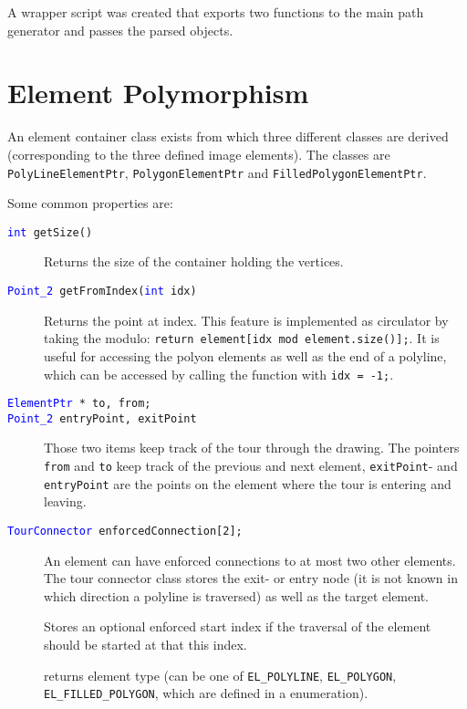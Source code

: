 A wrapper script was created that exports two functions to the main path generator and passes the parsed objects.	

\section{Element Polymorphism}\label{sec:elem}

An element container class exists from which three different classes are derived (corresponding to the three defined image elements). The classes are \texttt{PolyLineElementPtr}, \texttt{PolygonElementPtr} and \texttt{FilledPolygonElementPtr}.

Some common properties are:

\begin{description}

\item[\texttt{\textcolor{blue}{int} getSize()}] Returns the size of the container holding the vertices.

\item[\texttt{\textcolor{blue}{Point\_2} getFromIndex(\textcolor{blue}{int} idx)}] Returns the point at index. This feature is implemented as circulator by taking the modulo: 
\texttt{return element[idx mod element.size()];}. 
It is useful for accessing the polyon elements as well as the end of a polyline, which can be accessed by calling the
function with \texttt{idx = -1;}.

\item[\texttt{\textcolor{blue}{ElementPtr} * to, from;}]
\item[\texttt{\textcolor{blue}{Point\_2} entryPoint, exitPoint}] Those two items keep track of the tour through the drawing. The pointers \texttt{from} and \texttt{to} keep track of the previous and next element, 
\texttt{exitPoint}- and \texttt{entryPoint} are the points on the element where the tour is entering and leaving.

\item[\texttt{\textcolor{blue}{TourConnector} enforcedConnection[2];}] An element can have enforced connections to at most two other elements. The tour connector class stores the exit- or entry node (it is not known in which direction a polyline is traversed) as well as the target element.

\item[] Stores an optional enforced start index if the traversal of the element should be started at that this index.

\item[] returns element type (can be one of \texttt{EL\_POLYLINE}, \texttt{EL\_POLYGON}, \texttt{EL\_FILLED\_POLYGON}, which are defined in a enumeration).

\end{description}

